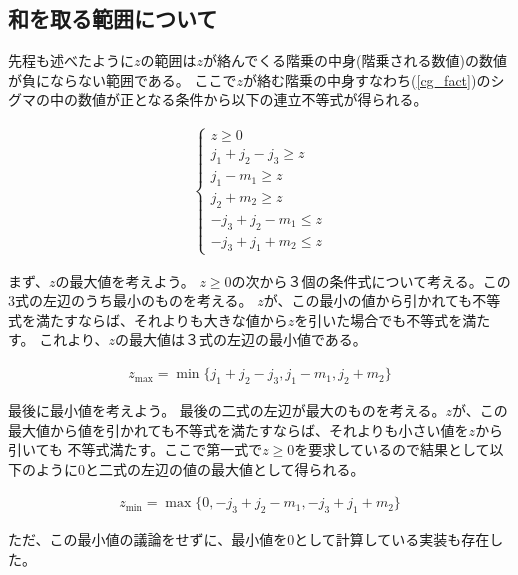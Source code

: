 \subsection{和を取る範囲について}

先程も述べたように$z$の範囲は$z$が絡んでくる階乗の中身(階乗される数値)の数値が負にならない範囲である。
ここで$z$が絡む階乗の中身すなわち(\ref{cg_fact})のシグマの中の数値が正となる条件から以下の連立不等式が得られる。

\begin{align}
    \begin{cases}
        z \ge 0  \tag{a}\\ 
        j_1 + j_2 - j_3 \ge z \\ 
        j_1 - m_1 \ge z \\
        j_2 + m_2 \ge z \\
        -j_3 + j_2 - m_1 \le z \\
        -j_3 + j_1 + m_2 \le z
    \end{cases}
\end{align}

まず、$z$の最大値を考えよう。
$z \ge 0$の次から３個の条件式について考える。この3式の左辺のうち最小のものを考える。
$z$が、この最小の値から引かれても不等式を満たすならば、それよりも大きな値から$z$を引いた場合でも不等式を満たす。
これより、$z$の最大値は３式の左辺の最小値である。

\begin{align}
    z_{\text{max}} = \min\{j_1 + j_2 - j_3, j_1 - m_1, j_2 + m_2\}
\end{align}

最後に最小値を考えよう。
最後の二式の左辺が最大のものを考える。$z$が、この最大値から値を引かれても不等式を満たすならば、それよりも小さい値を$z$から引いても
不等式満たす。ここで第一式で$z \ge 0$を要求しているので結果として以下のように$0$と二式の左辺の値の最大値として得られる。

\begin{align}
    z_{\text{min}} = \max\{0, -j_3 + j_2 - m_1, -j_3 + j_1 + m_2\}
\end{align}


ただ、この最小値の議論をせずに、最小値を$0$として計算している実装も存在した。

\begin{comment}
また$n_{min},n_{max}$はそれぞれ以下で定義する
\begin{align}
    \begin{cases}
        n_{\text{min}} &= \max\{0,J_2 + m_2 - (J_3 + m_3), J_1 - m_1 - (J_3 - m_3)\} \\ 
                       &= \max\{0,J_2 - J_3 - m_1, J_1 - J_3 + m_2 \} \\ 
        n_{\text{max}} &= \min\{J_1 + J_2 - J_3, J_2 + m_2, J_1 - m_1\} \\ 
    \end{cases}
\end{align}
\end{comment}
